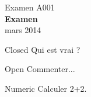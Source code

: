\documentclass[a4paper,10pt]{article}
\begin{document}

\begin{center}
{\Large Examen A001} \\  \textbf{\Large Examen} \\ mars 2014
\end{center}

\begin{question}{Closed}
Qui est vrai ?
\begin{reponses}[o]
\end{reponses}
\end{question}

\begin{question}{Open}
Commenter...
\end{question}

\begin{questionmultx}{Numeric}
Calculer 2+2.
\end{questionmultx}

\cleardoublepage


\end{document}
